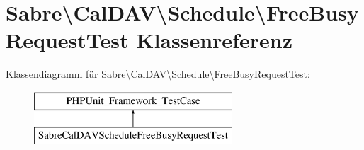 \hypertarget{class_sabre_1_1_cal_d_a_v_1_1_schedule_1_1_free_busy_request_test}{}\section{Sabre\textbackslash{}Cal\+D\+AV\textbackslash{}Schedule\textbackslash{}Free\+Busy\+Request\+Test Klassenreferenz}
\label{class_sabre_1_1_cal_d_a_v_1_1_schedule_1_1_free_busy_request_test}
Klassendiagramm für Sabre\textbackslash{}Cal\+D\+AV\textbackslash{}Schedule\textbackslash{}Free\+Busy\+Request\+Test\+:\begin{figure}[H]
\begin{center}
\leavevmode
\includegraphics[height=2.000000cm]{class_sabre_1_1_cal_d_a_v_1_1_schedule_1_1_free_busy_request_test}
\end{center}
\end{figure}
